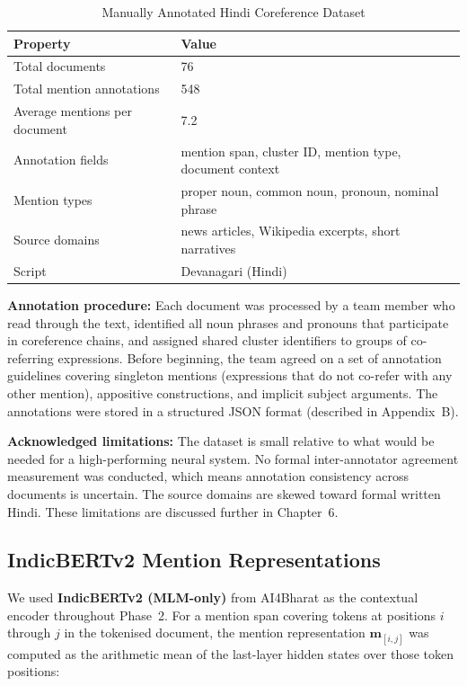 \documentclass[12pt,a4paper]{report}
\begin{document}
\begin{table}[H]
\centering
\caption{Manually Annotated Hindi Coreference Dataset}
\label{tab:dataset}
\begin{tabular}{|l|l|}
\hline
\textbf{Property} & \textbf{Value} \\
\hline
Total documents & 76 \\
Total mention annotations & 548 \\
Average mentions per document & 7.2 \\
Annotation fields & mention span, cluster ID, mention type, document context \\
Mention types & proper noun, common noun, pronoun, nominal phrase \\
Source domains & news articles, Wikipedia excerpts, short narratives \\
Script & Devanagari (Hindi) \\
\hline
\end{tabular}
\end{table}

\noindent \textbf{Annotation procedure:} Each document was processed by a team member who read through the text, identified all noun phrases and pronouns that participate in coreference chains, and assigned shared cluster identifiers to groups of co-referring expressions. Before beginning, the team agreed on a set of annotation guidelines covering singleton mentions (expressions that do not co-refer with any other mention), appositive constructions, and implicit subject arguments. The annotations were stored in a structured JSON format (described in Appendix~B).

\noindent \textbf{Acknowledged limitations:} The dataset is small relative to what would be needed for a high-performing neural system. No formal inter-annotator agreement measurement was conducted, which means annotation consistency across documents is uncertain. The source domains are skewed toward formal written Hindi. These limitations are discussed further in Chapter~6.

\subsection{IndicBERTv2 Mention Representations}

We used \textbf{IndicBERTv2 (MLM-only)} \cite{doddapaneni2023indicbert} from AI4Bharat as the contextual encoder throughout Phase~2. For a mention span covering tokens at positions $i$ through $j$ in the tokenised document, the mention representation $\mathbf{m}_{[i,j]}$ was computed as the arithmetic mean of the last-layer hidden states over those token positions:
\end{document}
